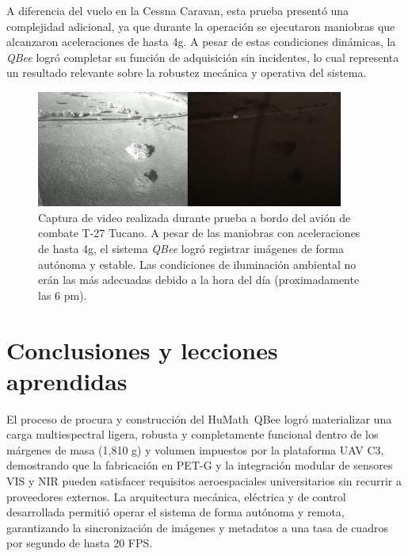     \noindent A diferencia del vuelo en la Cessna Caravan, esta prueba presentó una complejidad adicional, ya que durante la operación se ejecutaron maniobras que alcanzaron aceleraciones de hasta 4g. A pesar de estas condiciones dinámicas, la \textit{QBee} logró completar su función de adquisición sin incidentes, lo cual representa un resultado relevante sobre la robustez mecánica y operativa del sistema.
    
    \begin{figure}[!h]
    \centering
    \includegraphics[width=0.9\textwidth]{Figures/C4/t2.png}
    \caption{Captura de video realizada durante prueba a bordo del avión de combate T-27 Tucano. A pesar de las maniobras con aceleraciones de hasta 4g, el sistema \textit{QBee} logró registrar imágenes de forma autónoma y estable. Las condiciones de iluminación ambiental no erán las más adecuadas debido a la hora del día (proximadamente las 6 pm).}
    \label{fig:prueba_tucano}
    \end{figure}

    \section{Conclusiones y lecciones aprendidas}

    \noindent El proceso de procura y construcción del HuMath\textregistered~QBee logró materializar una carga multiespectral ligera, robusta y completamente funcional dentro de los márgenes de masa (1,810 g) y volumen impuestos por la plataforma UAV C3, demostrando que la fabricación en PET-G y la integración modular de sensores VIS y NIR pueden satisfacer requisitos aeroespaciales universitarios sin recurrir a proveedores externos. La arquitectura mecánica, eléctrica y de control desarrollada permitió operar el sistema de forma autónoma y remota, garantizando la sincronización de imágenes y metadatos a una tasa de cuadros por segundo de hasta 20 FPS.\\

